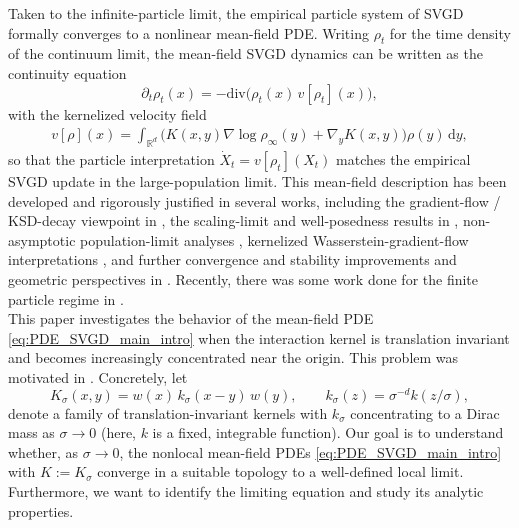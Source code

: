 \documentclass[reqno, 11pt]{amsart}
\numberwithin{equation}{section}
\theoremstyle{definition}
\begin{document}
    Taken to the infinite-particle limit, the empirical particle system of SVGD formally converges to a nonlinear mean-field PDE. Writing $\rho_t$ for the time density of the continuum limit, the mean-field SVGD dynamics can be written as the continuity equation
    \begin{equation}\label{eq:PDE_SVGD_main_intro}
        \partial_t \rho_t(x) = -\mathrm{div}\big( \rho_t(x)\, v[\rho_t](x)\big),
    \end{equation}
    with the kernelized velocity field
    \begin{align*}
        v[\rho](x) = \int_{\mathbb{R}^{d}} \Big( K(x,y)\nabla \log\rho_{\infty}(y) + \nabla_y K(x,y)\Big)\rho(y)\,\mathrm{d} y,
    \end{align*}
    so that the particle interpretation $\dot X_t = v[\rho_t](X_t)$ matches the empirical SVGD update in the large-population limit. This mean-field description has been developed and rigorously justified in several works, including the gradient-flow / KSD-decay viewpoint in \cite{liu_2017_stein}, the scaling-limit and well-posedness results in \cite{lu_lu_nolen_2019_scaling}, non-asymptotic population-limit analyses \cite{korba_salim_arbel_luise_gretton_2021_non}, kernelized Wasserstein-gradient-flow interpretations \cite{chewi_legouic_lu_maunu_rigollet_2020_svgd}, and further convergence and stability improvements and geometric perspectives in \cite{salim_sun_richtarik_2022_convergence,sun_karagulyan_richtarik_2023_convergence,duncan_nusken_szpruch_2023_geometry,carrillo_skrzeczkowski_2023_convergence,he_balasubramanian_sriperumbudur_lu_2024_regularized}. Recently, there was some work done for the finite particle regime in \cite{banerjee_balasubramanian_ghosal_2025_improved,he_balasubramanian_banerjee_ghosal_2026_finite}.\\
    
    This paper investigates the behavior of the mean-field PDE \eqref{eq:PDE_SVGD_main_intro} when the interaction kernel is translation invariant and becomes increasingly concentrated near the origin. This problem was motivated in \cite{lu_lu_nolen_2019_scaling}. Concretely, let
    \begin{equation}\label{eq:general_form_kernel_general_weights}
        K_\sigma(x,y)=w(x)\,k_\sigma(x-y)\,w(y), \qquad k_\sigma(z)=\sigma^{-d}k(z/\sigma),
    \end{equation}
    denote a family of translation-invariant kernels with $k_\sigma$ concentrating to a Dirac mass as $\sigma\to 0$ (here, $k$ is a fixed, integrable function). Our goal is to understand whether, as $\sigma\to 0$, the nonlocal mean-field PDEs \eqref{eq:PDE_SVGD_main_intro} with $K := K_\sigma$ converge in a suitable topology to a well-defined local limit. Furthermore, we want to identify the limiting equation and study its analytic properties. \\
    
\end{document}
